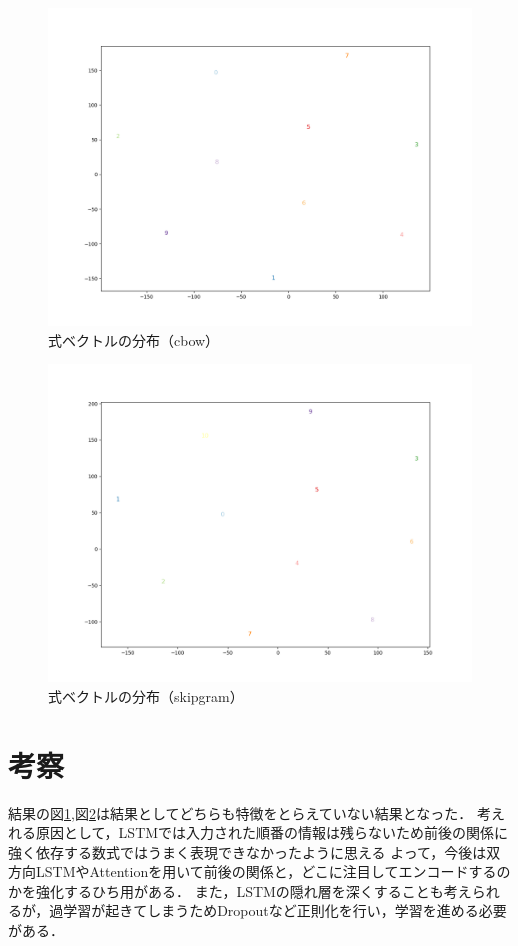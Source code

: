 \documentclass[a4j,11pt,report]{jsbook}
\begin{document}
\begin{center}
  \begin{figure}[H]
    \centering
    \includegraphics[width=0.8\linewidth]{image/cbow89x2.png}
    \caption{式ベクトルの分布（cbow）}
    \label{fig:formulavecter_fromCbow}
  \end{figure}
\end{center}


\begin{center}
  \begin{figure}[H]
    \centering
    \includegraphics[width=0.8\linewidth]{image/skip89x2.png}
    \caption{式ベクトルの分布（skipgram）}
    \label{fig:formulavecter_fromSkip}
  \end{figure}
\end{center}

\section{考察}
結果の図\ref{fig:formulavecter_fromCbow},図\ref{fig:formulavecter_fromSkip}は結果としてどちらも特徴をとらえていない結果となった．
考えれる原因として，LSTMでは入力された順番の情報は残らないため前後の関係に強く依存する数式ではうまく表現できなかったように思える
よって，今後は双方向LSTMやAttentionを用いて前後の関係と，どこに注目してエンコードするのかを強化するひち用がある．
また，LSTMの隠れ層を深くすることも考えられるが，過学習が起きてしまうためDropoutなど正則化を行い，学習を進める必要がある．
\end{document}

